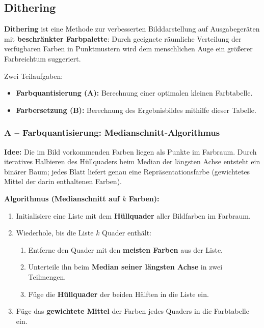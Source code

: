 \documentclass[12pt, a4paper]{article}
\begin{document}
\subsection{Dithering}
\label{sec:dithering}

\textbf{Dithering} ist eine Methode zur verbesserten Bilddarstellung auf Ausgabegeräten mit \textbf{beschränkter Farbpalette}: Durch geeignete räumliche Verteilung der verfügbaren Farben in Punktmustern wird dem menschlichen Auge ein größerer Farbreichtum suggeriert.

Zwei Teilaufgaben:
\begin{itemize}
  \item \textbf{Farbquantisierung (A):} Berechnung einer optimalen kleinen Farbtabelle.
  \item \textbf{Farbersetzung (B):} Berechnung des Ergebnisbildes mithilfe dieser Tabelle.
\end{itemize}

\subsubsection*{A -- Farbquantisierung: Medianschnitt-Algorithmus}

\textbf{Idee:} Die im Bild vorkommenden Farben liegen als Punkte im Farbraum. Durch iteratives Halbieren des Hüllquaders beim Median der längsten Achse entsteht ein binärer Baum; jedes Blatt liefert genau eine Repräsentationsfarbe (gewichtetes Mittel der darin enthaltenen Farben).

\textbf{Algorithmus (Medianschnitt auf $k$ Farben):}
\begin{enumerate}
  \item Initialisiere eine Liste mit dem \textbf{Hüllquader} aller Bildfarben im Farbraum.
  \item Wiederhole, bis die Liste $k$ Quader enthält:
    \begin{enumerate}[label=\alph*.]
      \item Entferne den Quader mit den \textbf{meisten Farben} aus der Liste.
      \item Unterteile ihn beim \textbf{Median seiner längsten Achse} in zwei Teilmengen.
      \item Füge die \textbf{Hüllquader} der beiden Hälften in die Liste ein.
    \end{enumerate}
  \item Füge das \textbf{gewichtete Mittel} der Farben jedes Quaders in die Farbtabelle ein.
\end{enumerate}
\end{document}
